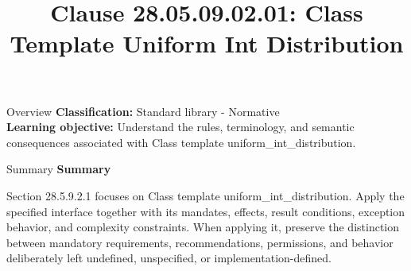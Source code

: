 \documentclass[10pt,letterpaper]{article}
\title{Clause 28.05.09.02.01: Class Template Uniform Int Distribution}
\author{}
\date{}
\begin{document}
\maketitle
\begin{CornellOverviewBox}{Overview}
\textbf{Classification:} Standard library - Normative\\[2pt]
\textbf{Learning objective:} Understand the rules, terminology, and semantic consequences associated with Class template uniform\_int\_distribution.
\end{CornellOverviewBox}\begin{CornellSummaryBox}{Summary}
{\sffamily\bfseries\color{Accent} Summary}\par\vspace{3pt}Section 28.5.9.2.1 focuses on Class template uniform\_int\_distribution. Apply the specified interface together with its mandates, effects, result conditions, exception behavior, and complexity constraints. When applying it, preserve the distinction between mandatory requirements, recommendations, permissions, and behavior deliberately left undefined, unspecified, or implementation-defined.
\end{CornellSummaryBox}
\end{document}
